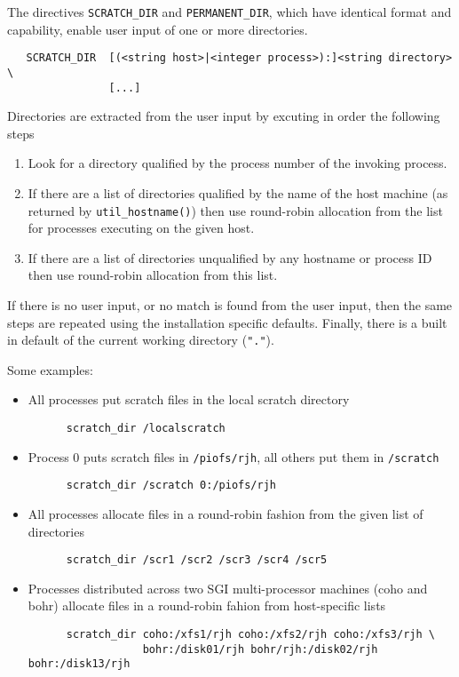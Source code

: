 The directives \verb+SCRATCH_DIR+ and \verb+PERMANENT_DIR+, which have
identical format and capability, enable user input of one or more
directories.

\begin{verbatim}
   SCRATCH_DIR  [(<string host>|<integer process>):]<string directory> \ 
                [...]
\end{verbatim}

Directories are extracted from the user input by excuting in order the
following steps
\begin{enumerate}
\item Look for a directory qualified by the process number of the
  invoking process.
\item If there are a list of directories qualified by the name of the
  host machine (as returned by \verb+util_hostname()+) then use
  round-robin allocation from the list for processes executing on the
  given host.
\item If there are a list of directories unqualified by any hostname
  or process ID then use round-robin allocation from this list.
\end{enumerate}
If there is no user input, or no match is found from the user input,
then the same steps are repeated using the installation specific
defaults.  Finally, there is a built in default of the current working
directory (\verb+"."+).

Some examples:
\begin{itemize}
\item  All processes put scratch files in the local scratch directory
\begin{verbatim}
      scratch_dir /localscratch
\end{verbatim}
\item Process 0 puts scratch files in \verb+/piofs/rjh+, all others put them
  in \verb+/scratch+
\begin{verbatim}
      scratch_dir /scratch 0:/piofs/rjh
\end{verbatim}
\item All processes allocate files in a round-robin fashion from the
given list of directories
\begin{verbatim}
      scratch_dir /scr1 /scr2 /scr3 /scr4 /scr5
\end{verbatim}
\item Processes distributed across two SGI multi-processor machines
  (coho and bohr) allocate files in a round-robin fahion from
  host-specific lists
\begin{verbatim}
      scratch_dir coho:/xfs1/rjh coho:/xfs2/rjh coho:/xfs3/rjh \
                  bohr:/disk01/rjh bohr/rjh:/disk02/rjh bohr:/disk13/rjh
\end{verbatim}
\end{itemize}

